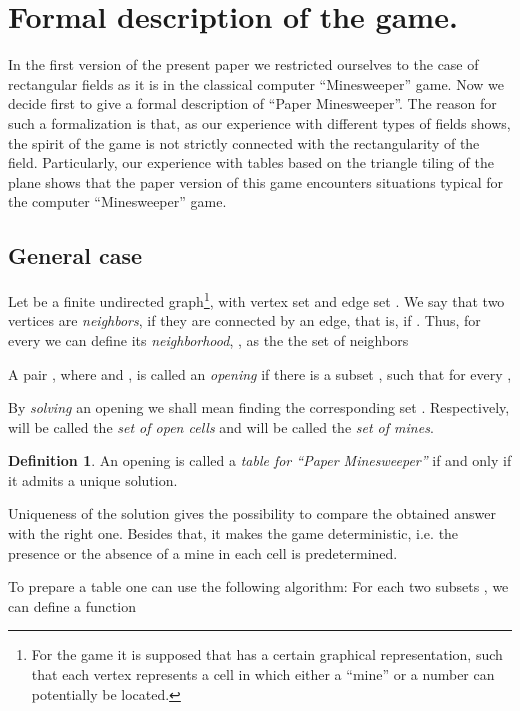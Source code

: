 \documentclass[english,12pt]{article}
\theoremstyle{remark}
\theoremstyle{definition}
\newtheorem{definition}{Definition}
\theoremstyle{definition}
\begin{document}
    \section{Formal description of the game.}
    In the first version of the present paper \cite{first} we
    restricted ourselves to the case of rectangular fields as it is in the
    classical computer ``Minesweeper'' game. Now we decide first
    to give a formal description of ``Paper Minesweeper''. The
    reason for such a formalization is that, as our experience
    with different types of fields shows, the spirit of the game is not strictly
    connected with the rectangularity of the field. Particularly,
    our experience with tables based on the triangle tiling of the plane
    shows that the paper version of this game encounters situations
    typical for the computer ``Minesweeper'' game.

       \subsection{General case}

Let  be a finite undirected graph\footnote{For the game it is
supposed     that  has a certain graphical representation, such
that each     vertex represents a cell in which either a ``mine''
or a number can potentially be located.}, with vertex set 
and edge set . We say that two vertices  are
\emph{neighbors}, if they are connected by an edge, that is, if
. Thus, for every  we can define its
\emph{neighborhood}, , as the the set of neighbors

A pair , where  and , is called an \emph{opening} if there is a
subset , such that for every ,


By \emph{solving} an opening  we shall mean finding the
corresponding set . Respectively,  will be called the
\emph{set of open cells} and  will be called the \emph{set of
mines}.

\begin{definition} \label{d:table}
An opening  is called a \emph{table for ``Paper Minesweeper''} if and only if it admits a
unique solution.
\end{definition}

Uniqueness of the solution gives the possibility to compare the obtained answer with the right one.
Besides that, it makes the game deterministic, i.e. the presence or the absence of a mine in each
cell is predetermined.

To prepare a table one can use the following algorithm: For each
two subsets ,  we
can define a function
\end{document}
